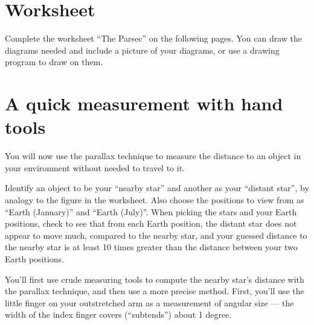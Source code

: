 \section{Worksheet}

Complete the worksheet ``The Parsec'' on the following pages. You can draw the diagrams needed and include a picture of your diagrams, or use a drawing program to draw on them.



\section{A quick measurement with hand tools}

You will now use the parallax technique to measure the distance to an object in your environment without needed to travel to it.

\begin{steps}
	\item Identify an object to be your ``nearby star'' and another as your ``distant star'', by analogy to the figure in the worksheet. Also choose the positions to view from as ``Earth (January)'' and ``Earth (July)''. When picking the stars and your Earth positions, check to see that from each Earth position, the distant star does not appear to move much, compared to the nearby star, and your guessed distance to the nearby star is at least 10 times greater than the distance between your two Earth positions.
\end{steps}
	
You'll first use crude measuring tools to compute the nearby star's distance with the parallax technique, and then use a more precise method. First, you'll use the little finger on your outstretched arm as a measurement of angular size --- the width of the index finger covers (``subtends'') about 1 degree.

